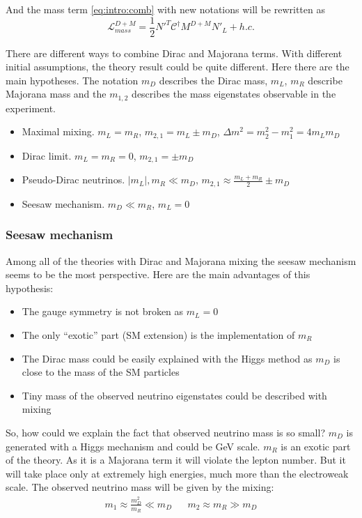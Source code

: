 \documentclass[../main.tex]{subfiles}
\begin{document}
And the mass term \autoref{eq:intro:comb} with new notations will be rewritten as
\begin{equation}
\mathcal{L}_{mass}^{D+M}=\frac{1}{2}N'^T\mathcal{C}^\dagger M^{D+M}N'_L+h.c.
\end{equation}

There are different ways to combine Dirac and Majorana terms. With different initial assumptions, the theory result could be quite different. Here there are the main hypotheses. The notation $m_D$ describes the Dirac mass, $m_L$, $m_R$ describe Majorana mass and the $m_{1,2}$ describes the mass eigenstates observable in the experiment.
\begin{itemize}
  \item Maximal mixing. $m_L=m_R$, $m_{2, 1}=m_L\pm m_D$, $\Delta m^2=m_2^2-m_1^2=4m_L m_D$
  \item Dirac limit. $m_L=m_R=0$, $m_{2,1}=\pm m_D$
  \item Pseudo-Dirac neutrinos. $\left|m_L\right|,m_R \ll m_D$, $m_{2,1}\approx\frac{m_L+m_R}{2}\pm m_D$
  \item Seesaw mechanism. $m_D \ll m_R$, $m_L=0$
\end{itemize}

\subsubsection{Seesaw mechanism}
Among all of the theories with Dirac and Majorana mixing the seesaw mechanism seems to be the most perspective. Here are the main advantages of this hypothesis:
\begin{itemize}
  \item The gauge symmetry is not broken as $m_L=0$
  \item The only ``exotic'' part (SM extension) is the implementation of $m_R$
  \item The Dirac mass could be easily explained with the Higgs method as $m_D$ is close to the mass of the SM particles
  \item Tiny mass of the observed neutrino eigenstates could be described with mixing
\end{itemize}

So, how could we explain the fact that observed neutrino mass is so small? $m_D$ is generated with a Higgs mechanism and could be GeV scale. $m_R$ is an exotic part of the theory. As it is a Majorana term it will violate the lepton number. But it will take place only at extremely high energies, much more than the electroweak scale. The observed neutrino mass will be given by the mixing:
\begin{align}
m_1\approx\frac{m_D^2}{m_R} \ll m_D && m_2\approx m_R \gg m_D
\end{align}
\end{document}
